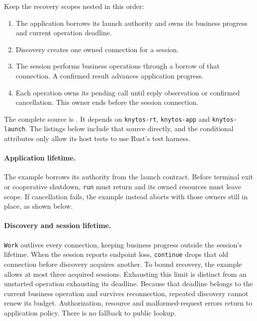 \begin{samepage}
Keep the recovery scopes nested in this order:

\begin{enumerate}
    \item The application borrows its launch authority and owns its business
        progress and current operation deadline.
    \item Discovery creates one owned connection for a session.
    \item The session performs business operations through a borrow of that
        connection. A confirmed result advances application progress.
    \item Each operation owns its pending call until reply observation or
        confirmed cancellation. This owner ends before the session connection.
\end{enumerate}
\end{samepage}

The complete source is
. It depends on
\texttt{knytos-rt}, \texttt{knytos-app} and
\texttt{knytos-launch}. The listings below include that source directly, and
the conditional attributes only allow its host tests to use Rust's test harness.

\paragraph*{Application lifetime.}
The example borrows its authority from the launch contract. Before terminal exit
or cooperative shutdown, \texttt{run} must return and its owned resources must
leave scope. If cancellation fails, the example instead aborts with those
owners still in place, as shown below.



\paragraph*{Discovery and session lifetime.}
\texttt{Work} outlives every connection, keeping business progress outside the
session's lifetime. When the session reports endpoint loss,
\texttt{continue} drops that old connection before discovery acquires another.
To bound recovery, the example allows at most three acquired sessions. Exhausting
this limit is distinct from an unstarted operation exhausting its deadline.
Because that deadline belongs to the current business operation and survives
reconnection, repeated discovery cannot renew its budget.
Authorization, resource and malformed-request errors return to application policy.
There is no fallback to public lookup.


